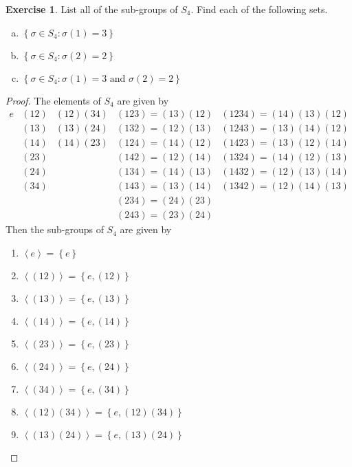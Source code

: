 \documentclass{article}
\theoremstyle{definition}
\newtheorem{theorem}{Exercise}[section]
\theoremstyle{remark}
\begin{document}
	\setcounter{theorem}{4}
	\begin{theorem}
		List all of the sub-groups of $S_4$. Find each of the following sets.
		\begin{enumerate}[(a)]
			\item $\left\{\sigma\in S_4:\sigma\left(1\right)=3
			\right\}$
			\item $\left\{\sigma\in S_4:\sigma\left(2\right)=2\right\}$
			\item $\left\{\sigma\in S_4:\sigma\left(1\right)=3\text{ and }\sigma\left(2\right)=2\right\}$
		\end{enumerate}
	\end{theorem}
	\begin{proof}
		The elements of $S_4$ are given by \[
		\begin{array}{c|c|c|c|c}
		e & (12) & (12)(34) & (123)=(13)(12) & (1234)=(14)(13)(12) \\ 
		& (13) & (13)(24) & (132)=(12)(13) & (1243)=(13)(14)(12) \\ 
		& (14) & (14)(23) & (124)=(14)(12) & (1423)=(13)(12)(14) \\ 
		& (23) &  & (142)=(12)(14) & (1324)=(14)(12)(13) \\ 
		& (24) &  & (134)=(14)(13) & (1432)=(12)(13)(14) \\ 
		& (34) &  & (143)=(13)(14) & (1342)=(12)(14)(13) \\ 
		&  &  & (234)=(24)(23) &  \\ 
		&  &  & (243)=(23)(24) & 
		\end{array} 
		\]
		Then the sub-groups of $S_4$ are given by
		\begin{multicols}{3}
		\begin{enumerate}
			\item $\left\langle e\right\rangle=\left\{e\right\}$
			\item $\left\langle (12)\right\rangle=\left\{e,(12)\right\}$
			\item $\left\langle (13)\right\rangle=\left\{e,(13)\right\}$
			\item $\left\langle (14)\right\rangle=\left\{e,(14)\right\}$
			\item $\left\langle (23)\right\rangle=\left\{e,(23)\right\}$
			\item $\left\langle (24)\right\rangle=\left\{e,(24)\right\}$
			\item $\left\langle (34)\right\rangle=\left\{e,(34)\right\}$
			\item $\left\langle (12)(34) \right\rangle=\left\{e,(12)(34)\right\}$
			\item $\left\langle (13)(24) \right\rangle=\left\{e,(13)(24)\right\}$

\end{enumerate}
\end{multicols}
\end{proof}
\end{document}
